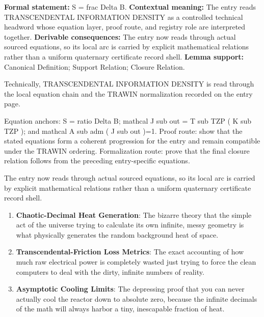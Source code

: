 \begingroup\footnotesize\setlength{\emergencystretch}{3em}\sloppy
\textbf{Formal statement:} S = frac Delta B. \textbf{Contextual meaning:} The entry reads TRANSCENDENTAL INFORMATION DENSITY as a controlled technical headword whose equation layer, proof route, and registry role are interpreted together. \textbf{Derivable consequences:} The entry now reads through actual sourced equations, so its local arc is carried by explicit mathematical relations rather than a uniform quaternary certificate record shell. \textbf{Lemma support:} Canonical Definition; Support Relation; Closure Relation.\par
\endgroup

Technically, TRANSCENDENTAL INFORMATION DENSITY is read through the local equation chain and the TRAWIN normalization recorded on the entry page.

Equation anchors: S = ratio Delta B; mathcal J sub out = T sub TZP ( K sub TZP ); and mathcal A sub adm ( J sub out )=1. Proof route: show that the stated equations form a coherent progression for the entry and remain compatible under the TRAWIN ordering. Formalization route: prove that the final closure relation follows from the preceding entry-specific equations.

The entry now reads through actual sourced equations, so its local arc is carried by explicit mathematical relations rather than a uniform quaternary certificate record shell.
\endgroup

\begin{enumerate}[leftmargin=1.6em,itemsep=6pt,topsep=4pt]
\item \textbf{Chaotic-Decimal Heat Generation}: The bizarre theory that the simple act of the universe trying to calculate its own infinite, messy geometry is what physically generates the random background heat of space.
\item \textbf{Transcendental-Friction Loss Metrics}: The exact accounting of how much raw electrical power is completely wasted just trying to force the clean computers to deal with the dirty, infinite numbers of reality.
\item \textbf{Asymptotic Cooling Limits}: The depressing proof that you can never actually cool the reactor down to absolute zero, because the infinite decimals of the math will always harbor a tiny, inescapable fraction of heat.
\end{enumerate}

